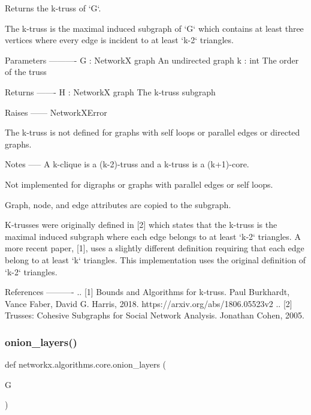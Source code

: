 \begin{DoxyVerb}Returns the k-truss of `G`.

The k-truss is the maximal induced subgraph of `G` which contains at least
three vertices where every edge is incident to at least `k-2` triangles.

Parameters
----------
G : NetworkX graph
  An undirected graph
k : int
  The order of the truss

Returns
-------
H : NetworkX graph
  The k-truss subgraph

Raises
------
NetworkXError

  The k-truss is not defined for graphs with self loops or parallel edges
  or directed graphs.

Notes
-----
A k-clique is a (k-2)-truss and a k-truss is a (k+1)-core.

Not implemented for digraphs or graphs with parallel edges or self loops.

Graph, node, and edge attributes are copied to the subgraph.

K-trusses were originally defined in [2] which states that the k-truss
is the maximal induced subgraph where each edge belongs to at least
`k-2` triangles. A more recent paper, [1], uses a slightly different
definition requiring that each edge belong to at least `k` triangles.
This implementation uses the original definition of `k-2` triangles.

References
----------
.. [1] Bounds and Algorithms for k-truss. Paul Burkhardt, Vance Faber,
   David G. Harris, 2018. https://arxiv.org/abs/1806.05523v2
.. [2] Trusses: Cohesive Subgraphs for Social Network Analysis. Jonathan
   Cohen, 2005.
\end{DoxyVerb}
 \mbox{\label{namespacenetworkx_1_1algorithms_1_1core_a090000409080af312bbb81a985cce70c}} 
\subsubsection{\texorpdfstring{onion\+\_\+layers()}{onion\_layers()}}
{\footnotesize\ttfamily def networkx.\+algorithms.\+core.\+onion\+\_\+layers (\begin{DoxyParamCaption}\item[{}]{G }\end{DoxyParamCaption})}

